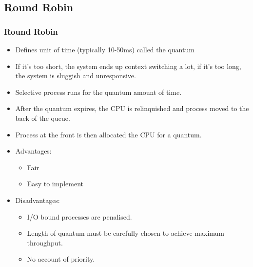 \documentclass{beamer}
\begin{document}
\subsection{Round Robin}
\begin{frame}
\frametitle{Round Robin}
\begin{itemize}
\item Defines unit of time (typically 10-50ms) called the {\color{red}quantum}
\item If it's too short, the system ends up context switching a lot, if it's too long, the system is sluggish and unresponsive.
\item Selective process runs for the {\color{red}quantum} amount of time.
\item After the {\color{red}quantum} expires, the CPU is relinquished and process moved to the back of the queue.
\item Process at the front is then allocated the CPU for a quantum.
\item Advantages:
\begin{itemize}
\item Fair
\item Easy to implement
\end{itemize}
\item Disadvantages:
\begin{itemize}
\item I/O bound processes are penalised.
\item Length of quantum must be carefully chosen to achieve maximum throughput.
\item No account of priority.
\end{itemize}
\end{itemize}
\end{frame}
\end{document}
